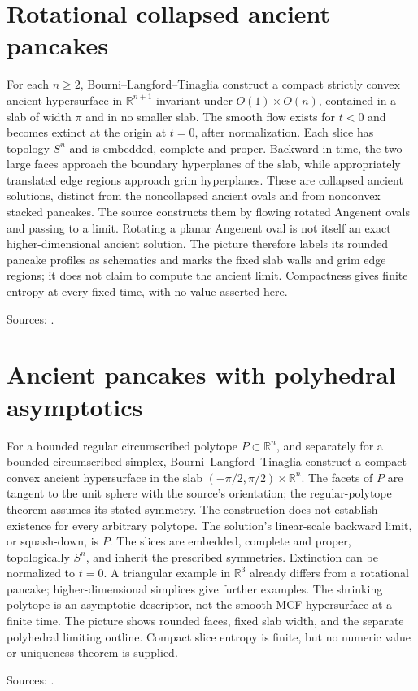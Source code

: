 \chapter{Rotational collapsed ancient pancakes}\label{sec:catalogue-collapsed-ancient-pancakes}
\begin{example}\label{ex:catalogue-collapsed-ancient-pancakes}
For each $n\ge2$, Bourni--Langford--Tinaglia construct a compact strictly convex ancient hypersurface in $\mathbb R^{n+1}$ invariant under $O(1)\times O(n)$, contained in a slab of width $\pi$ and in no smaller slab. The smooth flow exists for $t<0$ and becomes extinct at the origin at $t=0$, after normalization. Each slice has topology $S^n$ and is embedded, complete and proper.
Backward in time, the two large faces approach the boundary hyperplanes of the slab, while appropriately translated edge regions approach grim hyperplanes. These are collapsed ancient solutions, distinct from the noncollapsed ancient ovals and from nonconvex stacked pancakes. The source constructs them by flowing rotated Angenent ovals and passing to a limit. Rotating a planar Angenent oval is not itself an exact higher-dimensional ancient solution. The picture therefore labels its rounded pancake profiles as schematics and marks the fixed slab walls and grim edge regions; it does not claim to compute the ancient limit. Compactness gives finite entropy at every fixed time, with no value asserted here.
\par Sources: \cite{CatBourniLangfordTinaglia2017}.
\end{example}

\chapter{Ancient pancakes with polyhedral asymptotics}\label{sec:catalogue-polyhedral-ancient-pancakes}
\begin{example}\label{ex:catalogue-polyhedral-ancient-pancakes}
For a bounded regular circumscribed polytope $P\subset\mathbb R^n$, and separately for a bounded circumscribed simplex, Bourni--Langford--Tinaglia construct a compact convex ancient hypersurface in the slab $(-\pi/2,\pi/2)\times\mathbb R^n$. The facets of $P$ are tangent to the unit sphere with the source's orientation; the regular-polytope theorem assumes its stated symmetry. The construction does not establish existence for every arbitrary polytope. The solution's linear-scale backward limit, or squash-down, is $P$.
The slices are embedded, complete and proper, topologically $S^n$, and inherit the prescribed symmetries. Extinction can be normalized to $t=0$. A triangular example in $\mathbb R^3$ already differs from a rotational pancake; higher-dimensional simplices give further examples. The shrinking polytope is an asymptotic descriptor, not the smooth MCF hypersurface at a finite time. The picture shows rounded faces, fixed slab width, and the separate polyhedral limiting outline. Compact slice entropy is finite, but no numeric value or uniqueness theorem is supplied.
\par Sources: \cite{CatBourniLangfordTinaglia2022}.
\end{example}

